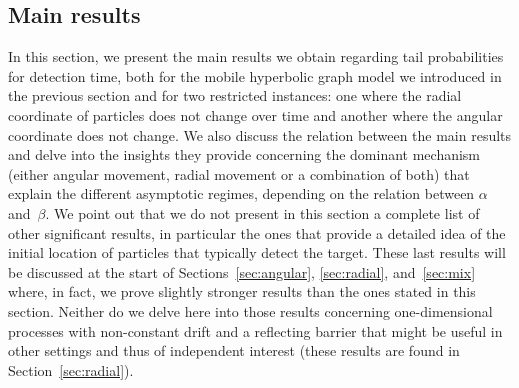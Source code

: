 \subsection{Main results}\label{sec:results}
%
In this section, we present the main results we obtain regarding tail probabilities for detection time, both for the mobile hyperbolic graph model we introduced in the previous section and for two restricted instances: one where the radial coordinate of particles does not change over time and another where the angular coordinate  does not change. We also discuss the relation between the main results and delve into the insights they provide concerning the dominant mechanism (either angular movement, radial movement or a combination of both) that explain the different asymptotic regimes, depending on the relation between $\alpha$ and~$\beta$. We point out that we do not present in this section a complete list of other significant results, in particular the ones that provide a detailed idea of the initial location of particles that typically detect the target. These last results will be discussed at the start of Sections~\ref{sec:angular}, \ref{sec:radial}, and~\ref{sec:mix}
where, in fact, we prove slightly stronger results than the ones stated in this section. Neither do we delve here into those results concerning one-dimensional processes with non-constant drift and a reflecting barrier that might be useful in other settings and thus of independent interest (these results are found in Section~\ref{sec:radial}).


